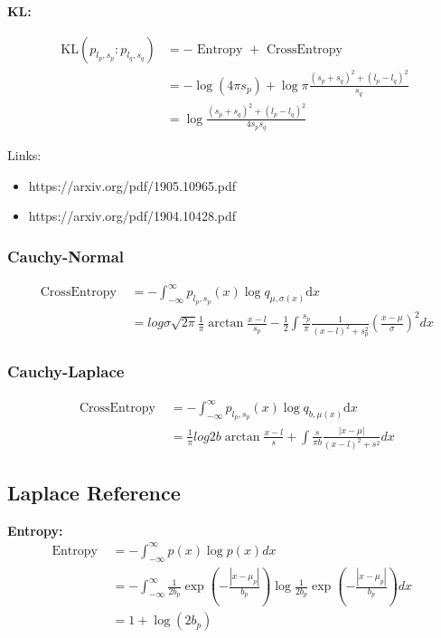 \documentclass{article}
\begin{document}
\noindent \textbf{KL:}

$$ \begin{aligned}\mathrm{KL}\left(p_{l_{p}, s_{p}}: p_{l_{q}, s_{q}}\right)&=-\text { Entropy }+\text { CrossEntropy } \\&=-\log (4 \pi s_{p})+\log \pi \frac{\left(s_{p}+s_{q}\right)^{2}+\left(l_{p}-l_{q}\right)^{2}}{s_{q}}\\&=\log\frac{\left(s_{p}+s_{q}\right)^{2}+\left(l_{p}-l_{q}\right)^{2}}{4 s_{p} s_{q}}\end{aligned} $$

Links:
\begin{itemize}
    \item https://arxiv.org/pdf/1905.10965.pdf
    \item https://arxiv.org/pdf/1904.10428.pdf
\end{itemize}

\subsubsection{Cauchy-Normal}
$$ \begin{aligned} \text { CrossEntropy }&=
-\int_{-\infty}^{\infty} p_{l_{p}, s_{p}}(x) \log q_{\mu, \sigma(x)} \mathrm{d} x \\
&=log\sigma\sqrt{2\pi}\frac{1}{\pi}\arctan\frac{x-l}{s_{p}}  -\frac{1}{2} \int  \frac{s_{p} }{\pi}\frac{1}{(x-l)^{2}+s_{p}^{2}}(\frac{x-\mu}{\sigma} )^{2} dx
\end{aligned} $$

\subsubsection{Cauchy-Laplace}
$$
\begin{aligned} \text { CrossEntropy }&=
-\int_{-\infty}^{\infty} p_{l_{p}, s_{p}}(x) \log q_{b, \mu(x)} \mathrm{d} x \\
&=\frac{1}{\pi}log2b\arctan\frac{x-l}{s}  +\int \frac{s}{\pi b} \frac{\left | x-\mu \right | }{(x-l)^{2}+s^{2}}dx 
\end{aligned}$$


\subsection{Laplace Reference}

\noindent \textbf{Entropy:}
$$ \begin{aligned} \text { Entropy }&=-\int_{-\infty}^{\infty} p(x) \log p(x) d x\\&=-\int_{-\infty}^{\infty}\frac{1}{2 b_{p}} \exp \left(-\frac{\left|x-\mu_{p}\right|}{b_{p}}\right) \log \frac{1}{2 b_{p}} \exp \left(-\frac{\left|x-\mu_{p}\right|}{b_{p}}\right) d x&\\&=1+\log \left(2 b_{p}\right)
\end{aligned} $$
\end{document}

